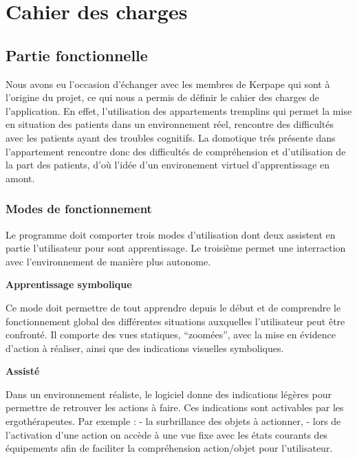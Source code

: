 
\section{Cahier des charges}
\subsection{Partie fonctionnelle}
  
Nous avons eu l’occasion d’échanger avec les membres de Kerpape qui sont à l’origine du projet, ce qui nous a permis de définir le cahier des charges de l’application.\newline
En effet, l'utilisation des appartements tremplins qui permet la mise en situation des patients dans un environnement réel, rencontre des difficultés avec les patients ayant des troubles cognitifs. La domotique trés présente dans l'appartement rencontre donc des difficultés de compréhension et d’utilisation de la part des patients, d'où l'idée d'un environement virtuel d'apprentissage en amont.

\subsubsection{Modes de fonctionnement}

Le programme doit comporter trois modes d’utilisation dont deux assistent en partie l’utilisateur pour sont apprentissage. Le troisième permet une interraction avec l'environnement de manière plus autonome.
\newline 

\textbf{Apprentissage symbolique}
\newline 

Ce mode doit permettre de tout apprendre depuis le début et de comprendre le fonctionnement global des différentes situations auxquelles l'utilisateur peut être confronté. Il comporte des vues statiques, “zoomées”, avec la mise en évidence d’action à réaliser, ainsi que des indications visuelles symboliques.
\newline 

\textbf{Assisté}
\newline 

Dans un environnement réaliste, le logiciel donne des indications légères pour permettre de retrouver les actions à faire. Ces indications sont activables par les ergothérapeutes. \newline 
Par exemple :\newline 
- la surbrillance des objets à actionner,\newline 
- lors de l'activation d'une action on accède à une vue fixe avec les états courants des équipements afin de faciliter la compréhension action/objet pour l'utilisateur.
\newline 

